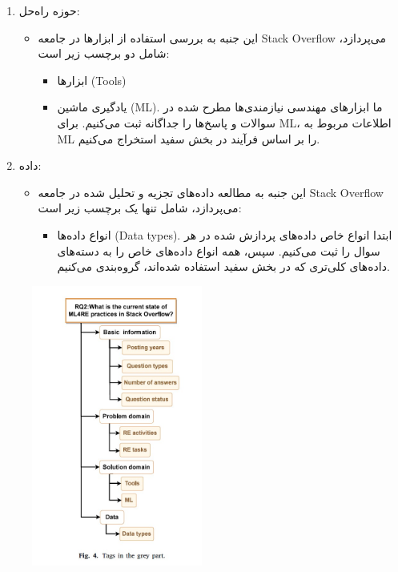 \documentclass[a4paper,10pt]{article}
\begin{document}
\begin{enumerate}
                        \item حوزه راه‌حل:
                        \begin{itemize}
                            \item این جنبه به بررسی استفاده از ابزارها در جامعه Stack Overflow می‌پردازد، شامل دو برچسب زیر است:
                            \begin{itemize}
                                \item ابزارها (Tools)
                                \item یادگیری ماشین (ML). ما ابزارهای مهندسی نیازمندی‌ها مطرح شده در سوالات و پاسخ‌ها را جداگانه ثبت می‌کنیم. برای ML، اطلاعات مربوط به ML را بر اساس فرآیند در بخش سفید استخراج می‌کنیم.
                            \end{itemize}
                        \end{itemize}
                        
                        \item داده:
                        \begin{itemize}
                            \item این جنبه به مطالعه داده‌های تجزیه و تحلیل شده در جامعه Stack Overflow می‌پردازد، شامل تنها یک برچسب زیر است:
                            \begin{itemize}
                                \item انواع داده‌ها (Data types). ابتدا انواع خاص داده‌های پردازش شده در هر سوال را ثبت می‌کنیم. سپس، همه انواع داده‌های خاص را به دسته‌های داده‌های کلی‌تری که در بخش سفید استفاده شده‌اند، گروه‌بندی می‌کنیم.
                            \end{itemize}
                        \end{itemize}
                    \end{enumerate}

                    \begin{figure}
                        \centering
                        \includegraphics[width=0.5\textwidth]{Image/fig-4.jpg}
                    \end{figure}
                
\end{document}
